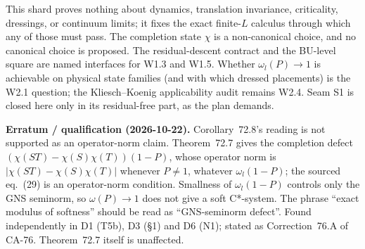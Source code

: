 This shard proves nothing about dynamics, translation invariance,
criticality, dressings, or continuum limits; it fixes the exact
finite-\(L\) calculus through which any of those must pass.  The
completion state \(\chi\) is a non-canonical choice, and no canonical
choice is proposed.  The residual-descent contract and the BU-level square
are named interfaces for W1.3 and W1.5.  Whether \(\omega_l(P)\to1\) is
achievable on physical state families (and with which dressed placements)
is the W2.1 question; the Kliesch--Koenig applicability audit remains
W2.4.  Seam S1 is closed here only in its residual-free part, as the plan
demands.

\textbf{Erratum / qualification (2026-10-22).}  Corollary~72.8's reading
is not supported as an operator-norm claim.  Theorem~72.7 gives the
completion defect \((\chi(ST)-\chi(S)\chi(T))(1-P)\), whose operator norm
is \(|\chi(ST)-\chi(S)\chi(T)|\) whenever \(P\neq1\), whatever
\(\omega_l(1-P)\); the sourced eq.~(29) is an operator-norm condition.
Smallness of \(\omega_l(1-P)\) controls only the GNS seminorm, so
\(\omega(P)\to1\) does not give a soft C*-system.  The phrase ``exact
modulus of softness'' should be read as ``GNS-seminorm defect''.  Found
independently in D1 (T5b), D3 (\S1) and D6 (N1); stated as Correction~76.A
of CA-76.  Theorem~72.7 itself is unaffected.
